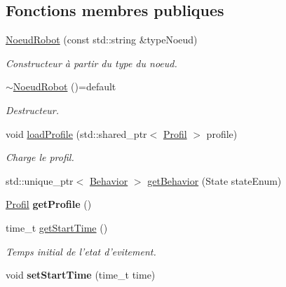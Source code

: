 \subsection*{Fonctions membres publiques}
\begin{DoxyCompactItemize}
\item 
\hyperlink{group__inf2990_ga147453ac7f72970d7d9bfe336998ad94}{Noeud\-Robot} (const std\-::string \&type\-Noeud)
\begin{DoxyCompactList}\small\item\em Constructeur à partir du type du noeud. \end{DoxyCompactList}\item 
\hypertarget{class_noeud_robot_a463e2ae1e6b69577057efa310b0f6cd2}{\hyperlink{class_noeud_robot_a463e2ae1e6b69577057efa310b0f6cd2}{$\sim$\-Noeud\-Robot} ()=default}\label{class_noeud_robot_a463e2ae1e6b69577057efa310b0f6cd2}

\begin{DoxyCompactList}\small\item\em Destructeur. \end{DoxyCompactList}\item 
void \hyperlink{group__inf2990_ga3f0e1360264e6ac80d410adbfd424cad}{load\-Profile} (std\-::shared\-\_\-ptr$<$ \hyperlink{struct_profil}{Profil} $>$ profile)
\begin{DoxyCompactList}\small\item\em Charge le profil. \end{DoxyCompactList}\item 
std\-::unique\-\_\-ptr$<$ \hyperlink{class_behavior}{Behavior} $>$ \hyperlink{group__inf2990_ga2ab91f95ea7a04f910907663f7f5a5a4}{get\-Behavior} (State state\-Enum)
\item 
\hypertarget{class_noeud_robot_af2128a24362b827c951aa718cbc5ec8f}{\hyperlink{struct_profil}{Profil} {\bfseries get\-Profile} ()}\label{class_noeud_robot_af2128a24362b827c951aa718cbc5ec8f}

\item 
\hypertarget{class_noeud_robot_a98ae88d2a5b0b3963dc29922a718bbb1}{time\-\_\-t \hyperlink{class_noeud_robot_a98ae88d2a5b0b3963dc29922a718bbb1}{get\-Start\-Time} ()}\label{class_noeud_robot_a98ae88d2a5b0b3963dc29922a718bbb1}

\begin{DoxyCompactList}\small\item\em Temps initial de l'etat d'evitement. \end{DoxyCompactList}\item 
\hypertarget{class_noeud_robot_af1a46250b551f0e63f918850b940a363}{void {\bfseries set\-Start\-Time} (time\-\_\-t time)}\label{class_noeud_robot_af1a46250b551f0e63f918850b940a363}


\end{DoxyCompactItemize}
